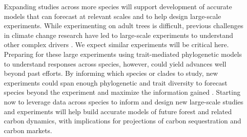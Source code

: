 \documentclass[11pt]{article}
\begin{document}
Expanding studies across more species will support development of accurate models that can forecast at relevant scales and to help design large-scale experiments. While experimenting on adult trees is difficult, previous challenges in climate change research have led to large-scale experiments to understand other complex drivers \citep[e.g. SPRUCE, DroughtNet, Pfynwald,][]{norby2011ecological,hanson2017attaining,smith2016drought}. We expect similar experiments will be critical here. Preparing for these large experiments using trait-mediated phylogenetic models to understand responses across species, however, could yield advances well beyond past efforts. By informing which species or clades to study, new experiments could span enough phylogenetic and trait diversity to forecast species beyond the experiment and maximize the information gained \citep{cadotte2017phylogenies}. Starting now to leverage data across species to inform and design new large-scale studies and experiments will help build accurate models of future forest and related carbon dynamics, with implications for projections of carbon sequestration and carbon markets.

 


\end{document}
